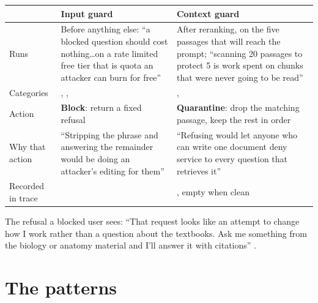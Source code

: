 \begin{center}
\begin{tabularx}{\textwidth}{@{}>{\raggedright\arraybackslash}p{2.6cm}LL@{}}
\toprule
& \textbf{Input guard} & \textbf{Context guard}\\
\midrule
Runs & Before anything else: \enquote{a blocked question should cost nothing\ldots on a rate limited free tier that is quota an attacker can burn for free}  & After reranking, on the five passages that will reach the prompt; \enquote{scanning 20 passages to protect 5 is work spent on chunks that were never going to be read} \\
Categories & , ,  & , \\
Action & \textbf{Block}: return a fixed refusal & \textbf{Quarantine}: drop the matching passage, keep the rest in order\\
Why that action & \enquote{Stripping the phrase and answering the remainder would be doing an attacker's editing for them}  & \enquote{Refusing would let anyone who can write one document deny service to every question that retrieves it} \\
Recorded in trace &  & , empty when clean\\
\bottomrule
\end{tabularx}
\end{center}

The refusal a blocked user sees: \enquote{That request looks like an attempt to change how I work rather than a question about the textbooks. Ask me something from the biology or anatomy material and I'll answer it with citations} .

\section{The patterns}

